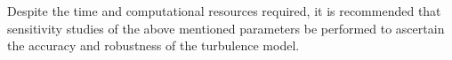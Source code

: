 Despite the time and computational resources required, it is recommended that 
sensitivity studies of the above mentioned parameters be performed
to ascertain the accuracy and robustness of the turbulence model.

%
%
%
%
%
%
%

